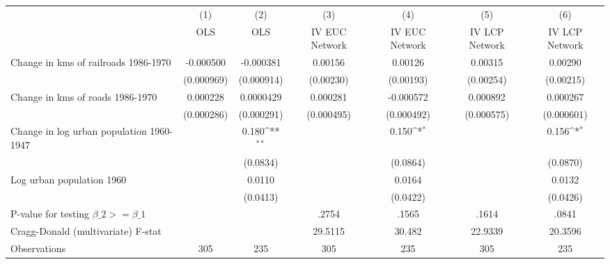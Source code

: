 {
\def\sym#1{\ifmmode^{#1}\else\(^{#1}\)\fi}
\begin{tabular}{l*{6}{c}}
\hline\hline
                &\multicolumn{1}{c}{(1)}&\multicolumn{1}{c}{(2)}&\multicolumn{1}{c}{(3)}&\multicolumn{1}{c}{(4)}&\multicolumn{1}{c}{(5)}&\multicolumn{1}{c}{(6)}\\
                &\multicolumn{1}{c}{OLS}&\multicolumn{1}{c}{OLS}&\multicolumn{1}{c}{IV EUC Network}&\multicolumn{1}{c}{IV EUC Network}&\multicolumn{1}{c}{IV LCP Network}&\multicolumn{1}{c}{IV LCP Network}\\
\hline
Change in kms of railroads 1986-1970&-0.000500         &-0.000381         &  0.00156         &  0.00126         &  0.00315         &  0.00290         \\
                &(0.000969)         &(0.000914)         &(0.00230)         &(0.00193)         &(0.00254)         &(0.00215)         \\
[1em]
Change in kms of roads 1986-1970& 0.000228         &0.0000429         & 0.000281         &-0.000572         & 0.000892         & 0.000267         \\
                &(0.000286)         &(0.000291)         &(0.000495)         &(0.000492)         &(0.000575)         &(0.000601)         \\
[1em]
Change in log urban population 1960-1947&                  &    0.180\sym{**} &                  &    0.150\sym{*}  &                  &    0.156\sym{*}  \\
                &                  & (0.0834)         &                  & (0.0864)         &                  & (0.0870)         \\
[1em]
Log urban population 1960&                  &   0.0110         &                  &   0.0164         &                  &   0.0132         \\
                &                  & (0.0413)         &                  & (0.0422)         &                  & (0.0426)         \\
\hline
P-value for testing $\beta\_{2} >= \beta\_{1}$&                  &                  &    .2754         &    .1565         &    .1614         &    .0841         \\
Cragg-Donald (multivariate) F-stat&                  &                  &  29.5115         &   30.482         &  22.9339         &  20.3596         \\
Observations    &      305         &      235         &      305         &      235         &      305         &      235         \\
\hline\hline
\end{tabular}
}
